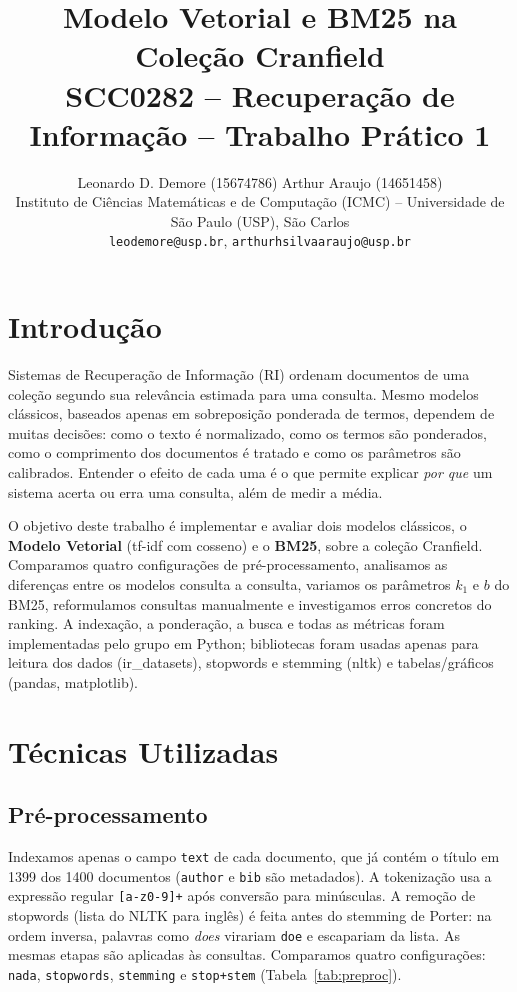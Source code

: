 \documentclass[10pt,a4paper]{article}
\title{\vspace{-1.2cm}\textbf{Modelo Vetorial e BM25 na Coleção Cranfield}\\[2pt]
\large SCC0282 -- Recuperação de Informação -- Trabalho Prático 1}
\author{
  Leonardo D. Demore (15674786) \quad
  Arthur Araujo (14651458)\\[2pt]
  \small Instituto de Ciências Matemáticas e de Computação (ICMC) -- Universidade de São Paulo (USP), São Carlos\\
  \small \texttt{leodemore@usp.br}, \texttt{arthurhsilvaaraujo@usp.br} %
}
\date{}
\newcommand{\term}[1]{\texttt{#1}}         %
\begin{document}
\maketitle
\vspace{-1.2cm}

\section{Introdução}
Sistemas de Recuperação de Informação (RI) ordenam documentos de uma coleção segundo sua
relevância estimada para uma consulta. Mesmo modelos clássicos, baseados apenas em
sobreposição ponderada de termos, dependem de muitas decisões: como o texto é normalizado,
como os termos são ponderados, como o comprimento dos documentos é tratado e como os
parâmetros são calibrados. Entender o efeito de cada uma é o que permite explicar
\emph{por que} um sistema acerta ou erra uma consulta, além de medir a média.

O objetivo deste trabalho é implementar e avaliar dois modelos clássicos, o \textbf{Modelo
Vetorial} (tf-idf com cosseno) e o \textbf{BM25}, sobre a coleção Cranfield. Comparamos quatro
configurações de pré-processamento, analisamos as diferenças entre os modelos consulta a consulta,
variamos os parâmetros $k_1$ e $b$ do BM25, reformulamos consultas manualmente e investigamos
erros concretos do ranking. A indexação, a ponderação, a busca e todas as métricas foram
implementadas pelo grupo em Python; bibliotecas foram usadas apenas para leitura dos dados
(ir\_datasets), stopwords e stemming (nltk) e tabelas/gráficos
(pandas, matplotlib).

\section{Técnicas Utilizadas}
\subsection{Pré-processamento}
Indexamos apenas o campo \texttt{text} de cada documento, que já contém o título em 1399 dos
1400 documentos (\texttt{author} e \texttt{bib} são metadados). A tokenização usa a expressão
regular \texttt{[a-z0-9]+} após conversão para minúsculas. A remoção de stopwords (lista do NLTK
para inglês) é feita antes do stemming de Porter: na ordem inversa, palavras como
\emph{does} virariam \term{doe} e escapariam da lista. As mesmas etapas são aplicadas às
consultas. Comparamos quatro configurações: \texttt{nada}, \texttt{stopwords}, \texttt{stemming}
e \texttt{stop+stem} (Tabela~\ref{tab:preproc}).
\end{document}
